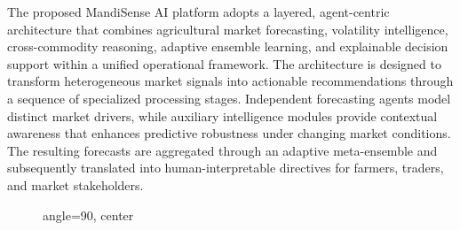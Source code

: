 \documentclass[12pt,a4paper]{report}
\theoremstyle{definition}
\theoremstyle{remark}
\begin{document}
The proposed MandiSense AI platform adopts a layered, agent-centric architecture that combines agricultural market forecasting, volatility intelligence, cross-commodity reasoning, adaptive ensemble learning, and explainable decision support within a unified operational framework. The architecture is designed to transform heterogeneous market signals into actionable recommendations through a sequence of specialized processing stages. Independent forecasting agents model distinct market drivers, while auxiliary intelligence modules provide contextual awareness that enhances predictive robustness under changing market conditions. The resulting forecasts are aggregated through an adaptive meta-ensemble and subsequently translated into human-interpretable directives for farmers, traders, and market stakeholders.


\begin{figure}[p]
    \centering
    \begin{adjustbox}{angle=90, center}
\end{adjustbox}
\end{figure}
\end{document}
